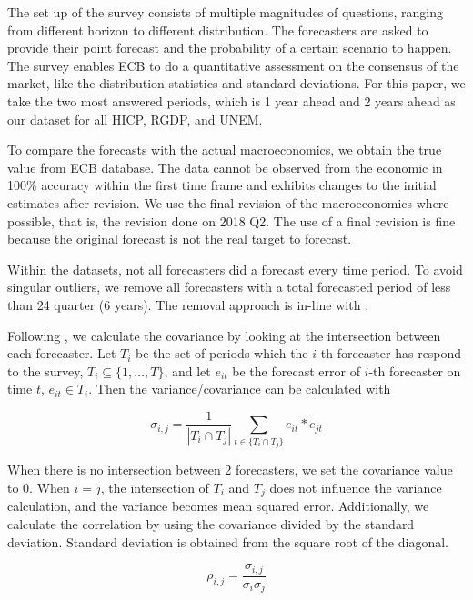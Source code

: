 \documentclass[11pt]{article}
\begin{document}
The set up of the survey consists of multiple magnitudes of questions,
ranging from different horizon to different distribution. The
forecasters are asked to provide their point forecast and the
probability of a certain scenario to happen. The survey enables ECB to
do a quantitative assessment on the consensus of the market, like the
distribution statistics and standard deviations. For this paper, we take
the two most answered periods, which is 1 year ahead and 2 years ahead
as our dataset for all HICP, RGDP, and UNEM.

To compare the forecasts with the actual macroeconomics, we obtain the
true value from ECB database. The data
cannot be observed from the economic in 100\% accuracy within the first
time frame and exhibits changes to the initial estimates after
revision. We use the final revision of the macroeconomics where
possible, that is, the revision done on 2018 Q2. The use of a final revision is fine because the
original forecast is not the real target to forecast.

Within the datasets, not all forecasters did a forecast every time
period. To avoid singular outliers, we remove all forecasters with a
total forecasted period of less than 24 quarter (6 years). The removal
approach is in-line with \cite{Matsypura2018}.

Following \cite{Matsypura2018}, we calculate the covariance by looking
at the intersection between each forecaster. Let $T_i$ be the set of periods which the $i$-th forecaster has respond to the survey, $T_i \subseteq \{1,\ldots,T\}$, and let $e_{it}$ be the forecast error of $i$-th forecaster on time $t$, $e_{it} \in T_i$. Then the variance/covariance can be calculated with

\begin{equation}
\label{equation}
\sigma_{i,j} = \frac{1}{|T_i \cap T_j|}\sum_{t\in \{T_i \cap T_j\}} e_{it}*e_{jt}
\end{equation}

When there is no intersection between 2 forecasters, we set the
covariance value to 0. When $i=j$, the intersection of $T_i$ and $T_j$ does not influence the variance calculation, and the variance becomes mean squared error. Additionally, we calculate the correlation by
using the covariance divided by the standard deviation. Standard
deviation is obtained from the square root of the diagonal.

\begin{equation}
\label{eqn: cov2cor}
\rho_{i,j} = \frac{\sigma_{i,j}}{\sigma_{i}\sigma_{j}}
\end{equation}
\end{document}
